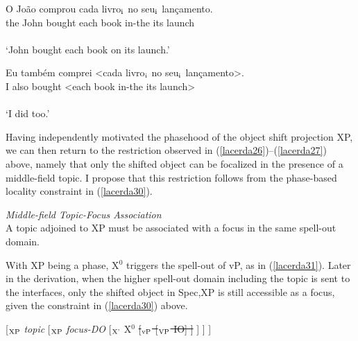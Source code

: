 \documentclass[output=paper]{langscibook}
\begin{document}
\begin{exe}
\ex \label{lacerda29}
\begin{xlist}
 \label{lacerda29A}
\gll O 	João 	comprou 	cada 	livro$_{\textnormal{i}}$ 	no 	seu$_{\textnormal{i}}$ 	lançamento.\\
the 	John 	bought 	each 	book 	in-the 	its 	launch\\\\
‘John bought each book on its launch.’

 \label{lacerda29B}
\gll Eu 	também 	comprei 	<cada 	livro$_{\textnormal{i}}$ 	no 	seu$_{\textnormal{i}}$ 	lançamento>.\\
I 	also	bought	<each	book 	in-the	its	launch>\\\\
‘I did too.’

\end{xlist}
\end{exe}

Having independently motivated the phasehood of the object shift projection XP, we can then return to the restriction observed in (\ref{lacerda26})–(\ref{lacerda27}) above, namely that only the shifted object can be focalized in the presence of a middle-field topic. I propose that this restriction follows from the phase-based locality constraint in (\ref{lacerda30}).


\begin{exe}
\ex \label{lacerda30}
\emph{Middle-field Topic-Focus Association}\\
A topic adjoined to XP must be associated with a focus in the same spell-out domain.
\end{exe}

With XP being a phase, X$^{0}$ triggers the spell-out of vP, as in (\ref{lacerda31}). Later in the derivation, when the higher spell-out domain including the topic is sent to the interfaces, only the shifted object in Spec,XP is still accessible as a focus, given the constraint in (\ref{lacerda30}) above.

\begin{exe}
\ex \label{lacerda31}
[$_{\textnormal{XP}}$ \emph{topic} [$_{\textnormal{XP}}$ \emph{focus-DO} [$_{\textnormal{X'}}$ X$^{0}$ \sout{[$_{\textnormal{vP}}$ [$_{\textnormal{VP}}$ IO] ]} ] ] ]
\end{exe}
\end{document}
